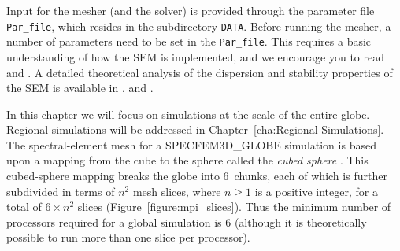 \documentclass[oneside,english]{book}
\begin{document}
Input for the mesher (and the solver) is provided through the parameter
file \texttt{Par\_file}, which resides in the subdirectory \texttt{DATA}.
Before running the mesher, a number of parameters need to be set in
the \texttt{Par\_file}. This requires a basic understanding of how
the SEM is implemented, and we encourage you to read \citet{KoVi98,KoTr99,Ch00,KoTr02a,KoTr02b,KoRiTr02,ChCaVi03,CaChViMo03}
and \citet{ChVa04}. A detailed theoretical analysis of the dispersion
and stability properties of the SEM is available in \citet{Coh02}, \citet{DeSe07}
and \citet{SeOl07}.


In this chapter we will focus on simulations at the scale of the entire
globe. Regional simulations will be addressed in Chapter~\ref{cha:Regional-Simulations}.
The spectral-element mesh for a SPECFEM3D\_GLOBE simulation is based
upon a mapping from the cube to the sphere called the \textit{cubed
sphere} \citep{Sad72,RoIaPa96}. This cubed-sphere mapping breaks
the globe into 6~chunks, each of which is further subdivided in terms
of $n^{2}$ mesh slices, where $n\ge1$ is a positive integer, for
a total of $6\times n^{2}$ slices (Figure~\ref{figure:mpi_slices}).
Thus the minimum number of processors required for a global simulation
is 6 (although it is theoretically possible to run more than one slice
per processor). %
\end{document}
